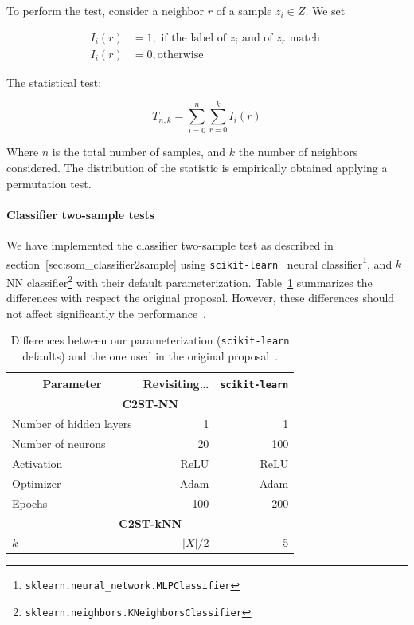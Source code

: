 To perform the test, consider a neighbor $r$ of a sample $z_i \in Z$. We set

\begin{equation}
\begin{split}
    I_i(r) &= 1, \textrm{ if the label of } z_i \textrm{ and of } z_r \textrm{ match }\\
    I_i(r) &= 0, \textrm{otherwise}
\end{split}
\end{equation}

The statistical test:

\begin{equation}
    T_{n,k} = \sum_{i=0}^{n}\sum_{r=0}^{k} I_i(r)
\end{equation}

Where $n$ is the total number of samples, and $k$ the number of neighbors considered.
The distribution of the statistic is empirically obtained applying a permutation test.
 
\paragraph{Classifier two-sample tests}
We have implemented the classifier two-sample test as described in section~\ref{sec:som_classifier2sample}
using \texttt{scikit-learn}~\cite{scikit-learn} neural
classifier\footnote{\texttt{sklearn.neural\_network.MLPClassifier}},
and $k$NN classifier\footnote{\texttt{sklearn.neighbors.KNeighborsClassifier}}
with their default parameterization. Table~\ref{tab:classifier_diff} summarizes the differences
with respect the original proposal. However, these differences should not affect significantly
the performance~\cite{lopez2016revisiting}.

\begin{table}[htpb]
\centering
\begin{tabular}{lrr}
\multicolumn{1}{c}{\bfseries Parameter}       & \bfseries Revisiting\ldots & \texttt{scikit-learn}     \\ \hline
\multicolumn{3}{c}{\bfseries C2ST-NN} \\
Number of hidden layers &  1     &   1    \\
Number of neurons       & 20     & 100    \\
Activation              & ReLU   & ReLU   \\
Optimizer               & Adam   & Adam   \\
Epochs                  & 100    & 200    \\
\multicolumn{3}{c}{\bfseries C2ST-kNN} \\
$k$                     & $|X|/2$ & 5 \\
\end{tabular}
\caption[Differences between our parameterization]{
    Differences between our parameterization (\texttt{scikit-learn} defaults) and the one
    used in the original proposal~\cite{lopez2016revisiting}.
}
\label{tab:classifier_diff}
\end{table}

